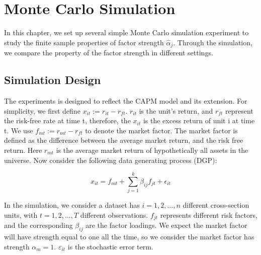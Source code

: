 \chapter{Monte Carlo Simulation}\label{MC}
	In this chapter, we set up several simple Monte Carlo simulation experiment to study the finite sample properties of factor strength $\hat{\alpha}_j$.
	Through the simulation, we compare the property of the factor strength in different settings.
	
\section{Simulation Design}
The experiments is designed to reflect the CAPM model and its extension.
For simplicity, we first define $x_{it} := r_{it}- r_{ft}$.
$r_{it}$ is the unit's return, and $r_{ft}$ represent the risk-free rate at time t, therefore, the $x_{it}$ is the excess return of unit i at time t.
We use $f_{mt}:=r_{mt} - r_{ft}$ to denote the market factor.
The market factor is defined as the difference between the average market return, and the risk free return.
Here $r_{mt}$ is the average market return of hypothetically all assets in the universe.
Now consider the following data generating process (DGP):
	
		\[ x_{it} = f_{mt} +  \sum_{j=1}^k\beta_{ij}f_{jt} +\epsilon_{it}  \]
	


In the simulation, we consider a dataset has $i = 1, 2,\dots, n$ different cross-section units, with $t= 1, 2,\dots, T$ different observations. 
$f_{jt}$ represents different risk factors, and the corresponding  $\beta_{ij}$ are the factor loadings.
We expect the market factor will have strength equal to one all the time, so we consider the market factor has strength $\alpha_m = 1$.
$\varepsilon_{it}$ is the stochastic error term.


